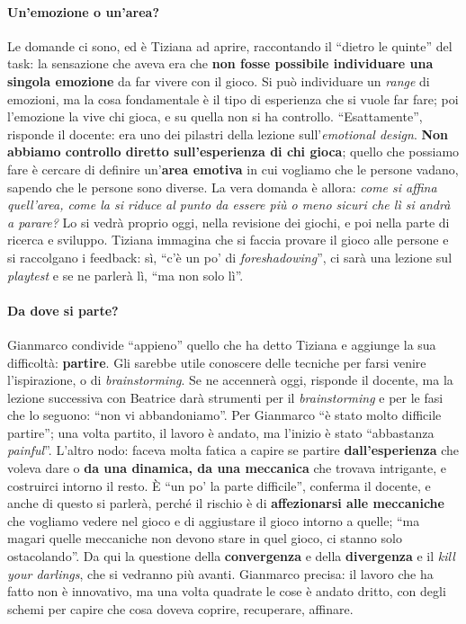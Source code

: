 \paragraph{Un'emozione o un'area?} Le domande ci sono, ed è Tiziana ad aprire,
raccontando il ``dietro le quinte'' del task: la sensazione che aveva era che
\textbf{non fosse possibile individuare una singola emozione} da far vivere con il
gioco. Si può individuare un \emph{range} di emozioni, ma la cosa fondamentale è il
tipo di esperienza che si vuole far fare; poi l'emozione la vive chi gioca, e su
quella non si ha controllo. ``Esattamente'', risponde il docente: era uno dei
pilastri della lezione sull'\emph{emotional design}. \textbf{Non abbiamo controllo
diretto sull'esperienza di chi gioca}; quello che possiamo fare è cercare di definire
un'\textbf{area emotiva} in cui vogliamo che le persone vadano, sapendo che le
persone sono diverse. La vera domanda è allora: \emph{come si affina quell'area,
come la si riduce al punto da essere più o meno sicuri che lì si andrà a parare?}
Lo si vedrà proprio oggi, nella revisione dei giochi, e poi nella parte di ricerca
e sviluppo. Tiziana immagina che si faccia provare il gioco alle persone e si
raccolgano i feedback: sì, ``c'è un po' di \emph{foreshadowing}'', ci sarà una
lezione sul \emph{playtest} e se ne parlerà lì, ``ma non solo lì''.

\paragraph{Da dove si parte?} Gianmarco condivide ``appieno'' quello che ha detto
Tiziana e aggiunge la sua difficoltà: \textbf{partire}. Gli sarebbe utile conoscere
delle tecniche per farsi venire l'ispirazione, o di \emph{brainstorming}. Se ne
accennerà oggi, risponde il docente, ma la lezione successiva con Beatrice darà
strumenti per il \emph{brainstorming} e per le fasi che lo seguono: ``non vi
abbandoniamo''. Per Gianmarco ``è stato molto difficile partire''; una volta partito,
il lavoro è andato, ma l'inizio è stato ``abbastanza \emph{painful}''. L'altro nodo:
faceva molta fatica a capire se partire \textbf{dall'esperienza} che voleva dare o
\textbf{da una dinamica, da una meccanica} che trovava intrigante, e costruirci
intorno il resto. È ``un po' la parte difficile'', conferma il docente, e anche di
questo si parlerà, perché il rischio è di \textbf{affezionarsi alle meccaniche} che
vogliamo vedere nel gioco e di aggiustare il gioco intorno a quelle; ``ma magari
quelle meccaniche non devono stare in quel gioco, ci stanno solo ostacolando''. Da
qui la questione della \textbf{convergenza} e della \textbf{divergenza} e il
\emph{kill your darlings}, che si vedranno più avanti. Gianmarco precisa: il lavoro
che ha fatto non è innovativo, ma una volta quadrate le cose è andato dritto, con
degli schemi per capire che cosa doveva coprire, recuperare, affinare.

